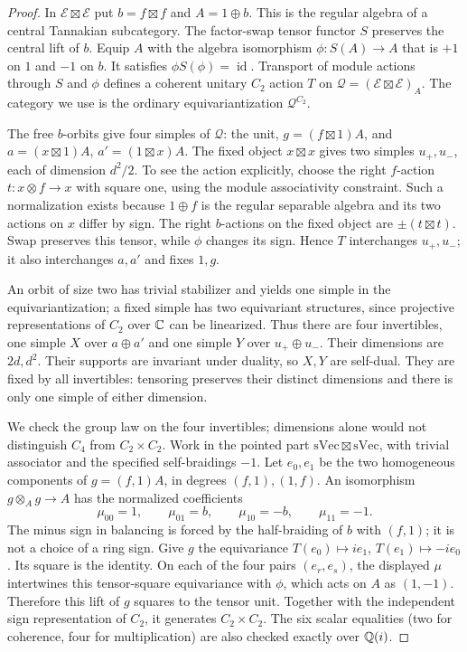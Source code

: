 \begin{proof}
In $\mathcal E\boxtimes\mathcal E$ put $b=f\boxtimes f$ and $A=1\oplus b$.
This is the regular algebra of a central Tannakian subcategory. The
factor-swap tensor functor $S$ preserves the central lift of $b$.
Equip $A$ with the algebra isomorphism $\phi:S(A)\to A$ that is $+1$ on
$1$ and $-1$ on $b$. It satisfies $\phi S(\phi)=\operatorname{id}$.
Transport of module actions through $S$ and $\phi$ defines a coherent
unitary $C_2$ action $T$ on $\mathcal Q=(\mathcal E\boxtimes\mathcal E)_A$.
The category we use is the ordinary equivariantization $\mathcal Q^{C_2}$.

The free $b$-orbits give four simples of $\mathcal Q$: the unit,
$g=(f\boxtimes1)A$, and $a=(x\boxtimes1)A$, $a'=(1\boxtimes x)A$.
The fixed object $x\boxtimes x$ gives two simples $u_+,u_-$, each of
dimension $d^2/2$. To see the action explicitly, choose the right
$f$-action $t:x\otimes f\to x$ with square one, using the module
associativity constraint. Such a normalization exists because
$1\oplus f$ is the regular separable algebra and its two actions on $x$
differ by sign. The right $b$-actions on the fixed object are
$\pm(t\boxtimes t)$. Swap preserves this tensor, while $\phi$ changes its
sign. Hence $T$ interchanges $u_+,u_-$; it also interchanges $a,a'$ and
fixes $1,g$.

An orbit of size two has trivial stabilizer and yields one simple in the
equivariantization; a fixed simple has two equivariant structures, since
projective representations of $C_2$ over $\mathbb C$ can be linearized. Thus
there are four invertibles, one simple $X$ over $a\oplus a'$ and one
simple $Y$ over $u_+\oplus u_-$. Their dimensions are $2d,d^2$.
Their supports are invariant under duality, so $X,Y$ are self-dual.
They are fixed by all invertibles: tensoring preserves their distinct
dimensions and there is only one simple of either dimension.

We check the group law on the four invertibles; dimensions alone would
not distinguish $C_4$ from $C_2\times C_2$. Work in the pointed part
$\mathrm{sVec}\boxtimes\mathrm{sVec}$, with trivial associator and the
specified self-braidings $-1$. Let $e_0,e_1$ be the two homogeneous
components of $g=(f,1)A$, in degrees $(f,1),(1,f)$. An isomorphism
$g\otimes_A g\to A$ has the normalized coefficients
\[
 \mu_{00}=1,\qquad \mu_{01}=b,\qquad
 \mu_{10}=-b,\qquad \mu_{11}=-1.
\]
The minus sign in balancing is forced by the half-braiding of $b$ with
$(f,1)$; it is not a choice of a ring sign. Give $g$ the equivariance
$T(e_0)\mapsto i e_1$, $T(e_1)\mapsto-i e_0$. Its square is the identity.
On each of the four pairs $(e_r,e_s)$, the displayed $\mu$ intertwines
this tensor-square equivariance with $\phi$, which acts on $A$ as
$(1,-1)$. Therefore this lift of $g$ squares to the tensor unit.
Together with the independent sign representation of $C_2$, it generates
$C_2\times C_2$. The six scalar equalities (two for coherence, four for
multiplication) are also checked exactly over $\mathbb Q(i)$.


\end{proof}
